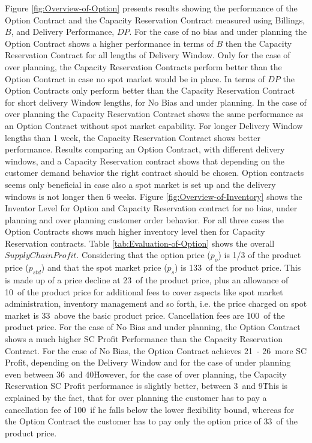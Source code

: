 \documentclass[12pt,english]{article}
\begin{document}
 Figure \ref{fig:Overview-of-Option} presents results showing the
 performance of the Option Contract and the Capacity Reservation Contract
 measured using Billings, $B$, and Delivery Performance, $DP.$ For
 the case of no bias and under planning the Option Contract shows a
 higher performance in terms of $B$ then the Capacity Reservation
 Contract for all lengths of Delivery Window. Only for the case of
 over planning, the Capacity Reservation Contracts perform better than
 the Option Contract in case no spot market would be in place. In terms
 of $DP$ the Option Contracts only perform better than the Capacity
 Reservation Contract for short delivery Window lengths, for No Bias
 and under planning. In the case of over planning the Capacity Reservation
 Contract shows the same performance as an Option Contract without
 spot market capability. For longer Delivery Window lengths than 1
 week, the Capacity Reservation Contract shows better performance.
 Results comparing an Option Contract, with different delivery windows,
 and a Capacity Reservation contract shows that depending on the customer
 demand behavior the right contract should be chosen. Option contracts
 seems only beneficial in case also a spot market is set up and the
 delivery windows is not longer then 6 weeks. Figure \ref{fig:Overview-of-Inventory}
shows the Inventor Level for Option and Capacity Reservation contract
 for no bias, under planning and over planning customer order behavior.
 For all three cases the Option Contracts shows much higher inventory
 level then for Capacity Reservation contracts. Table \ref{tab:Evaluation-of-Option}
 shows the overall $SupplyChainProfit$. Considering that the option
 price ($p_{o}$) is 1/3 of the product price ($p_{std}$) and that
 the spot market price ($p_{s}$) is 133\ of the product price. This
 is made up of a price decline at 23\ of the product price, plus an
 allowance of 10\ of the product price for additional fees to cover
 aspects like spot market administration, inventory management and
 so forth, i.e. the price charged on spot market is 33\ above the
 basic product price. Cancellation fees are 100\ of the product price.
 For the case of No Bias and under planning, the Option Contract shows
 a much higher SC Profit Performance than the Capacity Reservation
 Contract. For the case of No Bias, the Option Contract achieves 21\
 - 26\ more SC Profit, depending on the Delivery Window and for the
 case of under planning even between 36\ and 40\. However, for the
 case of over planning, the Capacity Reservation SC Profit performance
 is slightly better, between 3\ and 9\. This is explained by the
 fact, that for over planning the customer has to pay a cancellation
 fee of 100\ if he falls below the lower flexibility bound, whereas
 for the Option Contract the customer has to pay only the option price
 of 33\ of the product price. 
\end{document}
